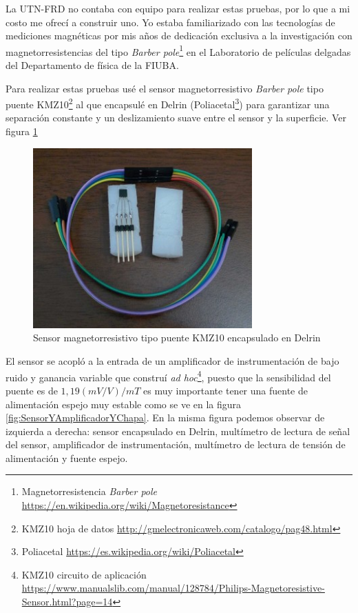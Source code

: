   La UTN-FRD no contaba con equipo para realizar estas pruebas, por lo que a mi costo me ofrecí a construir uno. Yo estaba familiarizado con las tecnologías de mediciones magnéticas por mis años de dedicación exclusiva a la investigación con magnetorresistencias del tipo \textit{Barber pole}\footnote{Magnetorresistencia \textit{Barber pole} \url{https://en.wikipedia.org/wiki/Magnetoresistance}} en el Laboratorio de películas delgadas del Departamento de física de la FIUBA. 
  
  Para realizar estas pruebas usé el sensor magnetorresistivo \textit{Barber pole} tipo puente KMZ10\footnote{KMZ10 hoja de datos \url{http://gmelectronicaweb.com/catalogo/pag48.html}} al que encapsulé en Delrin (Poliacetal\footnote{Poliacetal \url{https://es.wikipedia.org/wiki/Poliacetal}}) para garantizar una separación constante y un deslizamiento suave entre el sensor y la superficie. Ver figura \ref{fig:SensorKMZ10} 

\begin{figure}[htpb]
    \centering
    \includegraphics[width=0.75\textwidth]{./Figures/SensorKMZ10}
	\caption{Sensor magnetorresistivo tipo puente KMZ10 encapsulado en Delrin}
	\label{fig:SensorKMZ10}
 \end{figure}

El sensor se acopló a la entrada de un amplificador de instrumentación de bajo ruido y ganancia variable que construí \textit{ad hoc}\footnote{KMZ10 circuito de aplicación \url{https://www.manualslib.com/manual/128784/Philips-Magnetoresistive-Sensor.html?page=14}}, puesto que la sensibilidad del puente es de $1,19(mV/V)/mT$ es muy importante tener una fuente de alimentación espejo muy estable como se ve en la figura 
\ref{fig:SensorYAmplificadorYChapa}. En la misma figura podemos observar de izquierda a derecha: sensor encapsulado en Delrin, multímetro de lectura de señal del sensor, amplificador de instrumentación, multímetro de lectura de tensión de alimentación y fuente espejo.

